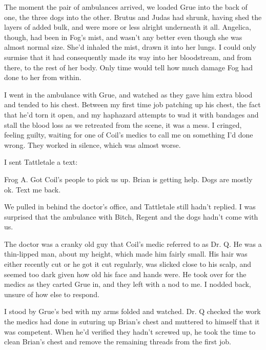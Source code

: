 The moment the pair of ambulances arrived, we loaded Grue into the back of one, the three dogs into the other.  Brutus and Judas had shrunk, having shed the layers of added bulk, and were more or less alright underneath it all.  Angelica, though, had been in Fog's mist, and wasn't any better even though she was almost normal size.  She'd inhaled the mist, drawn it into her lungs.  I could only surmise that it had consequently made its way into her bloodstream, and from there, to the rest of her body.  Only time would tell how much damage Fog had done to her from within.



I went in the ambulance with Grue, and watched as they gave him extra blood and tended to his chest.  Between my first time job patching up his chest, the fact that he'd torn it open, and my haphazard attempts to wad it with bandages and stall the blood loss as we retreated from the scene, it was a mess.  I cringed, feeling guilty, waiting for one of Coil's medics to call me on something I'd done wrong.  They worked in silence, which was almost worse.



I sent Tattletale a text:



Frog A.  Got Coil's people to pick us up.  Brian is getting help.  Dogs are mostly ok.  Text me back.



We pulled in behind the doctor's office, and Tattletale still hadn't replied.  I was surprised that the ambulance with Bitch, Regent and the dogs hadn't come with us.



The doctor was a cranky old guy that Coil's medic referred to as Dr. Q.  He was a thin-lipped man, about my height, which made him fairly small.  His hair was either recently cut or he got it cut regularly, was slicked close to his scalp, and seemed too dark given how old his face and hands were.  He took over for the medics as they carted Grue in, and they left with a nod to me.  I nodded back, unsure of how else to respond.



I stood by Grue's bed with my arms folded and watched.  Dr. Q checked the work the medics had done in suturing up Brian's chest and muttered to himself that it was competent.  When he'd verified they hadn't screwed up, he took the time to clean Brian's chest and remove the remaining threads from the first job.



